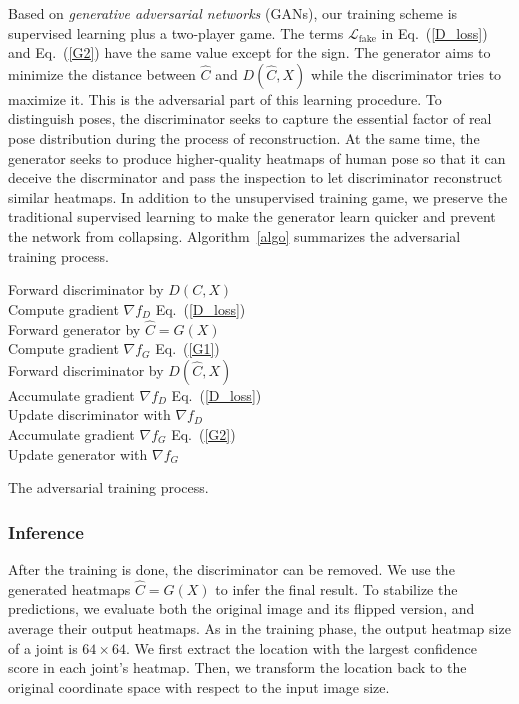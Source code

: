 \documentclass[10pt,twocolumn,letterpaper]{article}
\begin{document}
Based on {\em generative adversarial networks} (GANs), our training scheme is supervised learning plus a two-player game. The terms $\mathcal{L}_{\mathrm{fake}}$ in Eq.~(\ref{D_loss}) and Eq.~(\ref{G2}) have the same value except for the sign. The generator aims to minimize the distance between $\hat{C}$ and $D(\hat{C}, X)$ while the discriminator tries to maximize it. This is the adversarial part of this learning procedure. To distinguish poses, the discriminator seeks to capture the essential factor of real pose distribution during the process of reconstruction. At the same time, the generator seeks to produce higher-quality heatmaps of human pose so that it can deceive the discrminator and pass the inspection to let discriminator reconstruct similar heatmaps. In addition to the unsupervised training game, we preserve the traditional supervised learning to make the generator learn quicker and prevent the network from collapsing. Algorithm~\ref{algo} summarizes the adversarial training process.


\begin{algorithm}
    {
      Forward discriminator by $D(C, X)$ 
      \\ Compute gradient $\nabla f_{D}$ \wrt Eq.~(\ref{D_loss})
      \\ Forward generator by $\hat{C} = G(X)$ 
      \\ Compute gradient $\nabla f_{G}$ \wrt Eq.~(\ref{G1})
      \\ Forward discriminator by $D(\hat{C}, X)$
      \\ Accumulate gradient $\nabla f_{D}$ \wrt Eq.~(\ref{D_loss})
	  \\ Update discriminator with $\nabla f_{D}$
      \\ Accumulate gradient $\nabla f_{G}$ \wrt Eq.~(\ref{G2})
	  \\ Update generator with $\nabla f_{G}$
    }
    \caption{The adversarial training process.}
    \label{algo}
\end{algorithm}

\subsubsection{Inference}

After the training is done, the discriminator can be removed. We use the generated heatmaps $\hat{C} = G(X)$ to infer the final result. To stabilize the predictions, we evaluate both the original image and its flipped version, and average their output heatmaps. As in the training phase, the output heatmap size of a joint is $64\times64$. We first extract the location with the largest confidence score in each joint's heatmap. Then, we transform the location back to the original coordinate space with respect to the input image size.  
\end{document}
